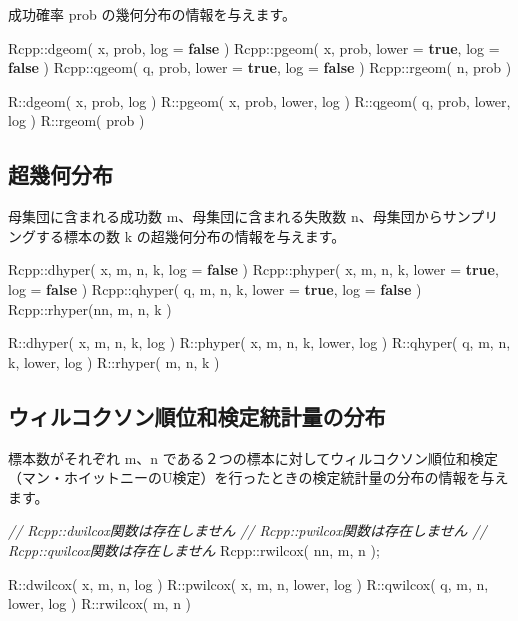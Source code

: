 \documentclass[]{book}
\newenvironment{Shaded}{\begin{snugshade}}{\end{snugshade}}
\newcommand{\CommentTok}[1]{\textcolor[rgb]{0.56,0.35,0.01}{\textit{#1}}}
\newcommand{\KeywordTok}[1]{\textcolor[rgb]{0.13,0.29,0.53}{\textbf{#1}}}
\newcommand{\NormalTok}[1]{#1}
\begin{document}
成功確率 prob の幾何分布の情報を与えます。

\begin{Shaded}
\begin{Highlighting}[]
\NormalTok{Rcpp::dgeom( x, prob,               log = }\KeywordTok{false}\NormalTok{ )}
\NormalTok{Rcpp::pgeom( x, prob, lower = }\KeywordTok{true}\NormalTok{, log = }\KeywordTok{false}\NormalTok{ )}
\NormalTok{Rcpp::qgeom( q, prob, lower = }\KeywordTok{true}\NormalTok{, log = }\KeywordTok{false}\NormalTok{ )}
\NormalTok{Rcpp::rgeom( n, prob )}

\NormalTok{R::dgeom( x, prob, log )}
\NormalTok{R::pgeom( x, prob, lower, log )}
\NormalTok{R::qgeom( q, prob, lower, log )}
\NormalTok{R::rgeom(    prob )}
\end{Highlighting}
\end{Shaded}

\subsection{超幾何分布}

母集団に含まれる成功数 m、母集団に含まれる失敗数 n、母集団からサンプリングする標本の数 k の超幾何分布の情報を与えます。

\begin{Shaded}
\begin{Highlighting}[]
\NormalTok{Rcpp::dhyper( x, m, n, k,               log = }\KeywordTok{false}\NormalTok{ )}
\NormalTok{Rcpp::phyper( x, m, n, k, lower = }\KeywordTok{true}\NormalTok{, log = }\KeywordTok{false}\NormalTok{ )}
\NormalTok{Rcpp::qhyper( q, m, n, k, lower = }\KeywordTok{true}\NormalTok{, log = }\KeywordTok{false}\NormalTok{ )}
\NormalTok{Rcpp::rhyper(nn, m, n, k )}

\NormalTok{R::dhyper( x, m, n, k,        log )}
\NormalTok{R::phyper( x, m, n, k, lower, log )}
\NormalTok{R::qhyper( q, m, n, k, lower, log )}
\NormalTok{R::rhyper(    m, n, k )}
\end{Highlighting}
\end{Shaded}

\subsection{ウィルコクソン順位和検定統計量の分布}

標本数がそれぞれ m、n である２つの標本に対してウィルコクソン順位和検定（マン・ホイットニーのU検定）を行ったときの検定統計量の分布の情報を与えます。

\begin{Shaded}
\begin{Highlighting}[]
\CommentTok{// Rcpp::dwilcox関数は存在しません}
\CommentTok{// Rcpp::pwilcox関数は存在しません}
\CommentTok{// Rcpp::qwilcox関数は存在しません}
\NormalTok{Rcpp::rwilcox( nn, m, n );}

\NormalTok{R::dwilcox( x, m, n,        log )}
\NormalTok{R::pwilcox( x, m, n, lower, log )}
\NormalTok{R::qwilcox( q, m, n, lower, log )}
\NormalTok{R::rwilcox(    m, n )}
\end{Highlighting}
\end{Shaded}
\end{document}
